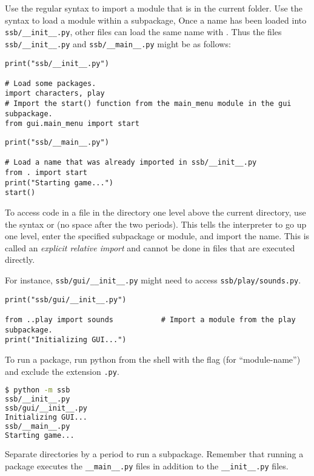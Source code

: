 Use the regular syntax to import a module that is in the current folder.
Use the syntax  to load a module within a subpackage,
Once a name has been loaded into \texttt{ssb/\_\_init\_\_.py}, other files can load the same name with .
Thus the files \texttt{ssb/\_\_init\_\_.py} and \texttt{ssb/\_\_main\_\_.py} might be as follows:

\begin{lstlisting}
print("ssb/__init__.py")

# Load some packages.
import characters, play
# Import the start() function from the main_menu module in the gui subpackage.
from gui.main_menu import start
\end{lstlisting}

\begin{lstlisting}
print("ssb/__main__.py")

# Load a name that was already imported in ssb/__init__.py
from . import start
print("Starting game...")
start()
\end{lstlisting}

To access code in a file in the directory one level above the current directory, use the syntax  or  (no space after the two periods).
This tells the interpreter to go up one level, enter the specified subpackage or module, and import the name.
This is called an \emph{explicit relative import} and cannot be done in files that are executed directly.

For instance, \texttt{ssb/gui/\_\_init\_\_.py} might need to access \texttt{ssb/play/sounds.py}.

\begin{lstlisting}
print("ssb/gui/__init__.py")

from ..play import sounds           # Import a module from the play subpackage.
print("Initializing GUI...")
\end{lstlisting}

To run a package, run python from the shell with the flag  (for ``module-name'') and exclude the extension \texttt{.py}.

\begin{lstlisting}[language=bash]
$ python -m ssb
ssb/__init__.py
ssb/gui/__init__.py
Initializing GUI...
ssb/__main__.py
Starting game...
\end{lstlisting}

Separate directories by a period to run a subpackage.
Remember that running a package executes the \texttt{\_\_main\_\_.py} files in addition to the \texttt{\_\_init\_\_.py} files.

